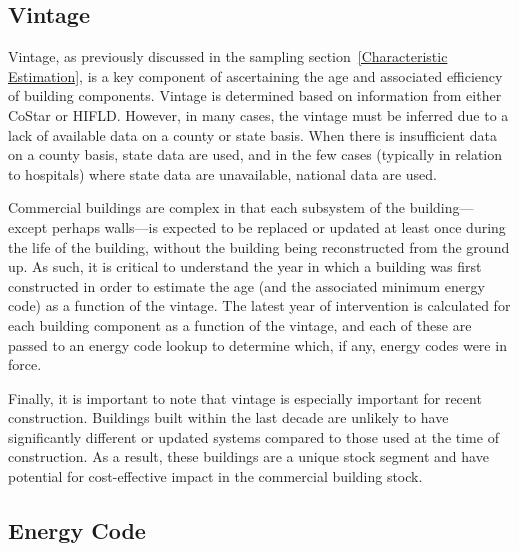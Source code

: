 \subsection{Vintage}

Vintage, as previously discussed in the sampling section~\ref{Characteristic Estimation}, is a key component of ascertaining the age and associated efficiency of building components. Vintage is determined based on information from either CoStar or HIFLD. However, in many cases, the vintage must be inferred due to a lack of available data on a county or state basis. When there is insufficient data on a county basis, state data are used, and in the few cases (typically in relation to hospitals) where state data are unavailable, national data are used.

Commercial buildings are complex in that each subsystem of the building---except perhaps walls---is expected to be replaced or updated at least once during the life of the building, without the building being reconstructed from the ground up. As such, it is critical to understand the year in which a building was first constructed in order to estimate the age (and the associated minimum energy code) as a function of the vintage. The latest year of intervention is calculated for each building component as a function of the vintage, and each of these are passed to an energy code lookup to determine which, if any, energy codes were in force.

Finally, it is important to note that vintage is especially important for recent construction. Buildings built within the last decade are unlikely to have significantly different or updated systems compared to those used at the time of construction. As a result, these buildings are a unique stock segment and have potential for cost-effective impact in the commercial building stock.

\subsection{Energy Code} %
\label{sec:energy_code}

